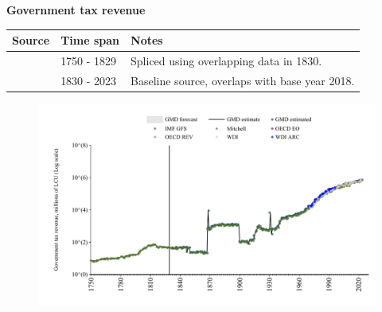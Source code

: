 \documentclass[12pt,a4paper,landscape]{article}
\begin{document}
\begin{adjustbox}{max totalsize={\paperwidth}{\paperheight},center}
\begin{minipage}[t][\textheight][t]{\textwidth}
\vspace*{0.5cm}
{}
\begin{center}
{\Large\bfseries Government tax revenue}
\end{center}
\vspace{0.5cm}
\begin{table}[H]
\centering
\small
\begin{tabular}{|l|l|l|}
\hline
\textbf{Source} & \textbf{Time span} & \textbf{Notes} \\
\hline
\rowcolor{white}\cite{Mitchell}& 1750 - 1829 &Spliced using overlapping data in 1830. \\
\rowcolor{lightgray}\cite{GMD_estimated}& 1830 - 2023 &Baseline source, overlaps with base year 2018. \\
\hline
\end{tabular}
\end{table}
\begin{figure}[H]
\centering
\includegraphics[width=\textwidth,height=0.6\textheight,keepaspectratio]{graphs/GBR_govtax.pdf}
\end{figure}
\end{minipage}
\end{adjustbox}
\end{document}
